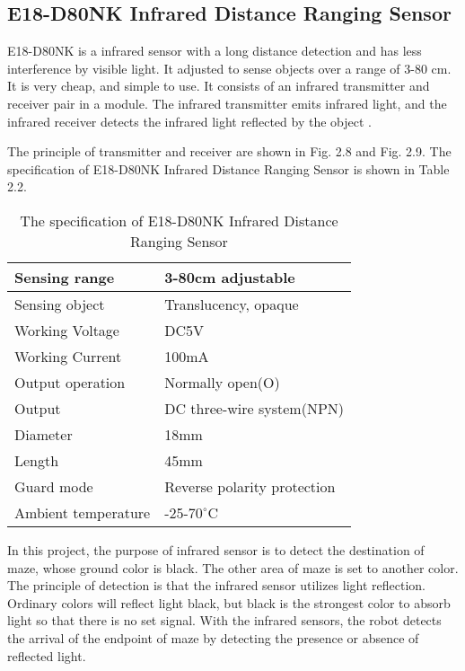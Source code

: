 \documentclass[11pt,times,oneside,openright,hardcopy]{eeereport}
\begin{document}
\subsection{E18-D80NK Infrared Distance Ranging Sensor}
E18-D80NK is a infrared sensor with a long distance detection and has less interference by visible light. It adjusted to sense objects over a range of 3-80 cm.
It is very cheap, and simple to use. It consists of an infrared transmitter and receiver pair in a module. The infrared transmitter emits infrared light, and
the infrared receiver detects the infrared light reflected by the object \cite{Aubakir:2015wn}.

The principle of transmitter and receiver are shown in Fig. 2.8 and Fig. 2.9. 
The specification of E18-D80NK Infrared Distance Ranging Sensor is shown in Table 2.2.

\begin{table}[h]
\label{tab:tab1}
\centering
\caption{The specification of E18-D80NK Infrared Distance Ranging Sensor}
\renewcommand{\arraystretch}{2}
\setlength{\tabcolsep}{10pt}
\begin{tabular}{ | m{6cm} | m{6cm} | } 
\hline Sensing range & 3-80cm adjustable \\ 
\hline Sensing object & Translucency, opaque \\
\hline Working Voltage & DC5V \\
\hline Working Current & 100mA \\
\hline Output operation & Normally open(O) \\
\hline Output & DC three-wire system(NPN) \\
\hline Diameter & 18mm \\
\hline Length & 45mm \\
\hline Guard mode & Reverse polarity protection \\
\hline Ambient temperature & -25-$70^{\circ}$C \\
\hline 
\end{tabular} 
\end{table}

In this project, the purpose of infrared sensor is to detect the destination of maze, whose ground color is black. The other area of maze is set to another color.
The principle of detection is that the infrared sensor utilizes light reflection. Ordinary colors will reflect light black, but black is the strongest color to absorb light so that there is no set signal.
With the infrared sensors, the robot detects the arrival of the endpoint of maze by detecting the presence or absence of reflected light.
\end{document}
